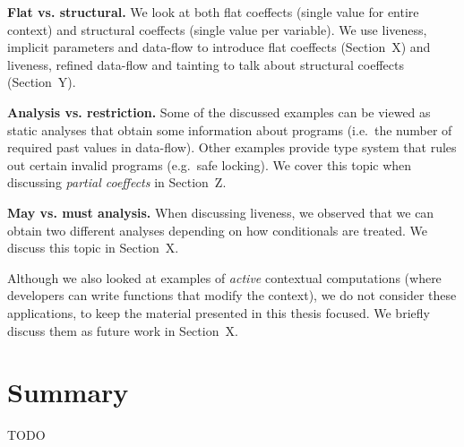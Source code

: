 \begin{compactitem}
\item \textbf{Flat vs. structural.} We look at both flat coeffects (single value for entire context) and 
  structural coeffects (single value per variable). We use liveness, implicit parameters and 
  data-flow to introduce flat coeffects (Section~X) and liveness, refined data-flow and tainting
  to talk about structural coeffects (Section~Y).
  
\item \textbf{Analysis vs. restriction.} Some of the discussed examples can be viewed as static
  analyses that obtain some information about programs (i.e.~the number of required past values
  in data-flow). Other examples provide type system that rules out certain invalid programs 
  (e.g.~safe locking). We cover this topic when discussing \emph{partial coeffects} in Section~Z.
  
\item \textbf{May vs. must analysis.} When discussing liveness, we observed that we can obtain 
  two different analyses depending on how conditionals are treated. We discuss this topic in 
  Section~X. %
\end{compactitem}

Although we also looked at examples of \emph{active} contextual computations (where developers can
write functions that modify the context), we do not consider these applications, to keep the 
material presented in this thesis focused. We briefly discuss them as future work in Section~X.


\section{Summary}

TODO

% 
